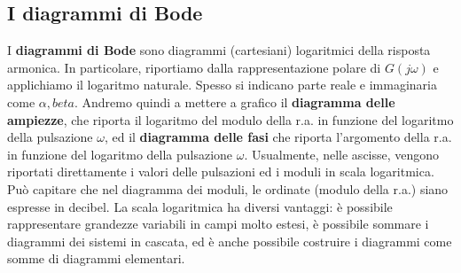 \documentclass[11pt]{article}
\begin{document}
\subsection{I diagrammi di Bode}
I \textbf{diagrammi di Bode} sono diagrammi (cartesiani) logaritmici della risposta armonica. In particolare, riportiamo dalla rappresentazione polare di $G(j\omega)$ e applichiamo il logaritmo naturale. Spesso si indicano parte reale e immaginaria come $\alpha, beta$. Andremo quindi a mettere a grafico il \textbf{diagramma delle ampiezze}, che riporta il logaritmo del modulo della r.a. in funzione del logaritmo della pulsazione $\omega$, ed il \textbf{diagramma delle fasi} che riporta l'argomento della r.a. in funzione del logaritmo della pulsazione $\omega$.
Usualmente, nelle ascisse, vengono riportati direttamente i valori delle pulsazioni ed i moduli in scala logaritmica. Può capitare che nel diagramma dei moduli, le ordinate (modulo della r.a.) siano espresse in decibel. La scala logaritmica ha diversi vantaggi: è possibile rappresentare grandezze variabili in campi molto estesi, è possibile sommare i diagrammi dei sistemi in cascata, ed è anche possibile costruire i diagrammi come somme di diagrammi elementari.
\end{document}
